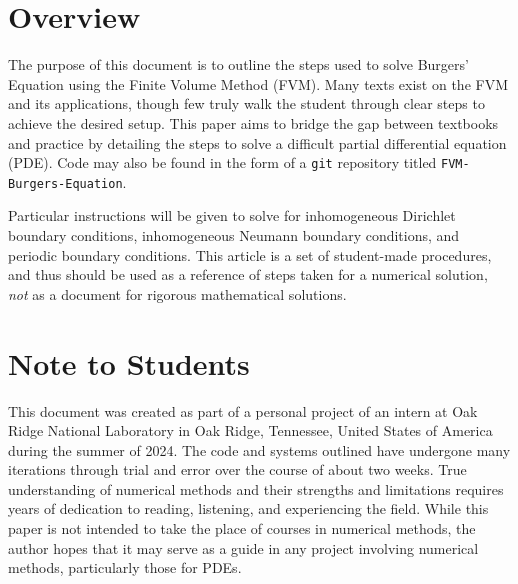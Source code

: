 \documentclass[11pt, letterpaper]{article}
\numberwithin{equation}{section}
\begin{document}
	\section*{Overview}\label{sec:overview}
	The purpose of this document is to outline the steps used to solve Burgers' Equation using the Finite Volume Method (FVM).
	Many texts exist on the FVM and its applications, though few truly walk the student through clear steps to achieve the desired setup.
	This paper aims to bridge the gap between textbooks and practice by detailing the steps to solve a difficult partial differential equation (PDE).
	Code may also be found in the form of a \texttt{git} repository titled \texttt{FVM-Burgers-Equation}.

	Particular instructions will be given to solve for inhomogeneous Dirichlet boundary conditions, inhomogeneous Neumann boundary conditions, and periodic boundary conditions.
	This article is a set of student-made procedures, and thus should be used as a reference of steps taken for a numerical solution, \textit{not} as a document for rigorous mathematical solutions.

	\section*{Note to Students}
	This document was created as part of a personal project of an intern at Oak Ridge National Laboratory in Oak Ridge, Tennessee, United States of America during the summer of 2024.
	The code and systems outlined have undergone many iterations through trial and error over the course of about two weeks.
	True understanding of numerical methods and their strengths and limitations requires years of dedication to reading, listening, and experiencing the field.
	While this paper is not intended to take the place of courses in numerical methods, the author hopes that it may serve as a guide in any project involving numerical methods, particularly those for PDEs.
\end{document}

